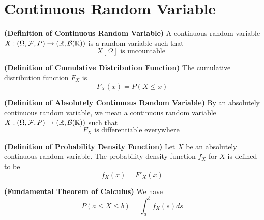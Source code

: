 \documentclass{report}
\begin{document}
\chapter{Continuous Random Variable}
\begin{definition}
\label{2.0.1}
\textbf{(Definition of Continuous Random Variable)} A continuous random variable $X:(\Omega,\mathcal{F},P)\rightarrow (\mathbb{R},\mathcal{B}(\mathbb{R}))$ is a random variable such that 
\begin{equation}
X[\Omega]\text{ is uncountable }
\end{equation}
\end{definition}
\begin{definition}
\label{2.0.2}
\textbf{(Definition of Cumulative Distribution Function)} The cumulative distribution function $F_X$ is 
 \begin{equation}
F_X(x)=P(X\leq x)
\end{equation}
\end{definition}
\begin{definition}
\label{2.0.3}
\textbf{(Definition of Absolutely Continuous Random Variable)} By an absolutely continuous random variable, we mean a continuous random variable $X:(\Omega,\mathcal{F},P)\rightarrow (\mathbb{R},\mathcal{B}(\mathbb{R}))$ such that
\begin{equation}
F_X\text{ is differentiable everywhere }
\end{equation}
\end{definition}
\begin{definition}
\label{2.0.4}
\textbf{(Definition of Probability Density Function)} Let $X$ be an absolutely continuous random variable. The probability density function $f_X$ for $X$ is defined to be
\begin{equation}
f_X(x)=F'_X(x)
\end{equation}
\end{definition}
\begin{theorem}
\label{2.0.5}
\textbf{(Fundamental Theorem of Calculus)} We have
\begin{equation}
P(a\leq X\leq b)=\int_a^b f_X(s)ds
\end{equation}
\end{theorem}
\end{document}

